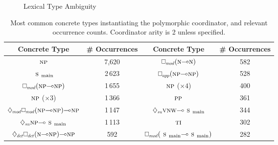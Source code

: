 \begin{figure}
	\centering
	\caption{Lexical Type Ambiguity}
	\label{figure:type_ambiguity}
\end{figure}

\begin{table}
	\centering
	\begin{tabularx}{0.99\textwidth}{@{}c@{}c@{\qquad}c@{}c@{}}
	Concrete Type & \# Occurrences & Concrete Type & \# Occurrences\\
	\toprule
	$\np[s]$ & 7,620 & $\dbox{mod}(\n[s]\li\n[s])$ & 582\\
	$\smain[s]$ & 2\,623 & $\dbox{app}(\np[s]\li\np[s])$ & 528\\
	$\dbox{mod}(\np[s]\li\np[s])$ & 1\,655 & $\np[s]$ ($\times 4$) & 400\\
	$\np[s]$ ($\times 3$) & 1\,366 & $\pp[s]$ & 361\\
	$\ddia{mod}\dbox{mod}(\np[s]\li\np[s])\li\np$ & 1\,147 & $\ddia{su}\vnw[s]\li\smain[s]$ & 344\\
	$\ddia{su}\np[s]\li\smain[s]$ & 1\,113 & $\ti[s]$ & 302\\
	$\ddia{det}\dbox{det}(\n[s]\li\np[s])\li\np[s]$ & 592 & $\dbox{mod}(\smain[s]\li\smain[s])$ & 282\\
	\end{tabularx}
	\caption{Most common concrete types instantiating the polymorphic coordinator, and relevant occurrence counts.
	Coordinator arity is 2 unless specified.}
	\label{table:polymorphic_crd}
\end{table}


